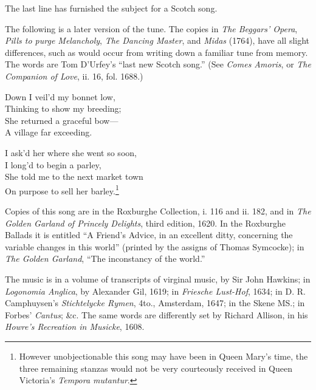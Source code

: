 The last line has furnished the subject for a Scotch song.

The following is a later version of the tune. The copies in \textit{The Beggars’
Opera}, \textit{ Pills to purge Melancholy}, \textit{The Dancing Master}, and \textit{Midas} (1764), have
all slight differences, such as would occur from writing down a familiar tune from
memory. The words are Tom D’Urfey’s “last new Scotch song.” (See
\textit{Comes Amoris}, or \textit{The Companion of Love}, ii. 16, fol. 1688.)



\begin{dcverse}\begin{altverse}
Down I veil’d my bonnet low,\\
Thinking to show my breeding;\\
She returned a graceful bow—\\
A village far exceeding.
\end{altverse}

\begin{altverse}
I ask’d her where she went so soon,\\
I long’d to begin a parley,\\
She told me to the next market town\\
On purpose to sell her barley.\footnote{\textit{}
However unobjectionable this song may have been in
Queen Mary’s time, the three remaining stanzas would
not be very courteously received in Queen Victoria's
\textit{Tempora mutantur}.}
\end{altverse}
\end{dcverse}
\pagebreak



Copies of this song are in the Roxburghe Collection, i. 116 and ii. 182, and
in \textit{The Golden Garland of Princely Delights}, third edition, 1620. In the
Roxburghe Ballads it is entitled “A Friend’s Advice, in an excellent ditty,
concerning the variable changes in this world” (printed by the assigns of Thomas
Symcocke); in \textit{The Golden Garland}, “The inconstancy of the world.”

The music is in a volume of transcripts of virginal music, by Sir John Hawkins;
in \textit{Logonomia Anglica}, by Alexander Gil, 1619; in \textit{Friesche Lust-Hof}, 1634; in
D. R. Camphuysen’s \textit{Stichtelycke Rymen}, 4to., Amsterdam, 1647; in the Skene
MS.; in Forbes’ \textit{Cantus}; \&c. The same words are differently set by Richard
Allison, in his \textit{Howre’s Recreation in Musicke}, 1608.

